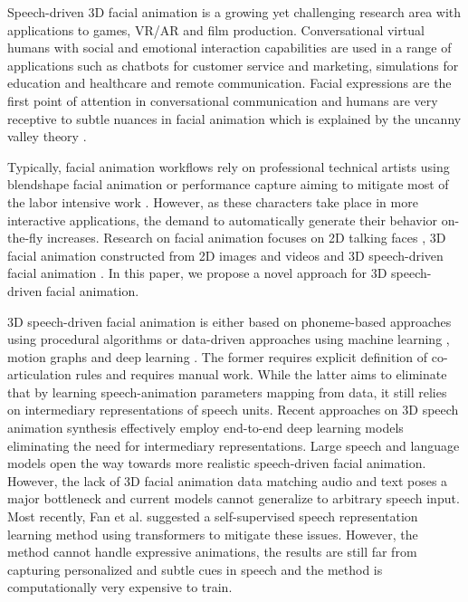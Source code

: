 \documentclass[10pt,twocolumn,letterpaper]{article}
\begin{document}
Speech-driven 3D facial animation is a growing yet challenging research area with applications to games, VR/AR and film production. Conversational virtual humans with social and emotional interaction capabilities are used in a range of applications such as chatbots for customer service and marketing, simulations for education and healthcare and remote communication. Facial expressions are the first point of attention in conversational communication and humans are very receptive to subtle nuances in facial animation which is explained by the uncanny valley theory \cite{Mori2012}. 
 
Typically, facial animation workflows rely on professional technical artists using blendshape facial animation \cite{Blendshape} or performance capture aiming to mitigate most of the labor intensive work \cite{Dynamixyz, faceware, di4d}. However, as these characters take place in more interactive applications, the demand to automatically generate their behavior on-the-fly increases. Research on facial animation focuses on 2D talking faces \cite{talkingFace4, Lu2021, talkingFace8, Perov2020}, 3D facial animation constructed from 2D images and videos \cite{DECA:Siggraph2021, Ma2021, EMOCA:CVPR:2021, Zhang2022} and 3D speech-driven facial animation \cite{Taylor2017, TeroKarras, MeshTalk, visemenet2018, VOCA2019, faceformer2022, Voice2FaceEA}. In this paper, we propose a novel approach for 3D speech-driven facial animation. 

3D speech-driven facial animation is either based on phoneme-based approaches using procedural algorithms \cite{jali, Charalambous2019} or data-driven approaches using machine learning \cite{Taylor2012}, motion graphs \cite{Cao2005} and deep learning \cite{Taylor2017, visemenet2018}. The former requires explicit definition of co-articulation rules and requires manual work. While the latter aims to eliminate that by learning speech-animation parameters mapping from data, it still relies on intermediary representations of speech units. Recent approaches on 3D speech animation synthesis effectively employ end-to-end deep learning models \cite{TeroKarras, MeshTalk, visemenet2018, VOCA2019, faceformer2022} eliminating the need for intermediary representations. Large speech and language models \cite{HuBERT, GPT3} open the way towards more realistic speech-driven facial animation. However, the lack of 3D facial animation data matching audio and text poses a major bottleneck and current models cannot generalize to arbitrary speech input. Most recently, Fan et al. \cite{faceformer2022} suggested a self-supervised speech representation learning method using transformers to mitigate these issues. However, the method cannot handle expressive animations, the results are still far from capturing personalized and subtle cues in speech and the method is computationally very expensive to train. 
\end{document}

